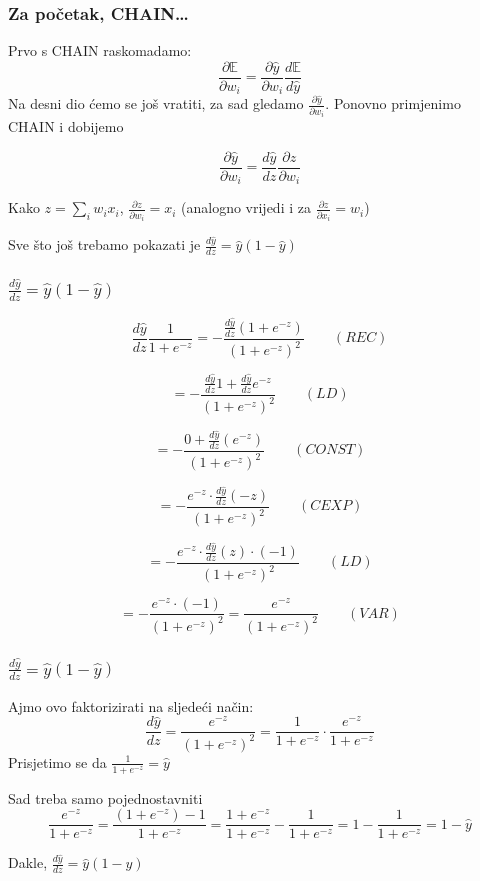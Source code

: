 \documentclass{beamer}
\begin{document}
\begin{frame}
\frametitle{Za po\v cetak, CHAIN\ldots}
Prvo s CHAIN raskomadamo:
$$\frac{\partial \mathbb{E}}{\partial w_i}= \frac{\partial \hat{y}}{\partial w_i} \frac{d \mathbb{E}}{d\hat{y}}$$\pause
Na desni dio \' cemo se jo\v s vratiti, za sad gledamo $\frac{\partial \hat{y}}{\partial w_i}$. Ponovno primjenimo CHAIN i dobijemo

$$\frac{\partial \hat{y}}{\partial w_i} = \frac{d \hat{y}}{d z} \frac{\partial z}{\partial w_i}$$\pause

Kako $z=\sum_i w_i x_i$, $\frac{\partial z}{\partial w_i}=x_i$ (analogno vrijedi i za $\frac{\partial z}{\partial x_i} = w_i$)\pause

\alert{Sve \v sto jo\v s trebamo pokazati je $\frac{d\hat{y}}{dz}=\hat{y}(1-\hat{y})$}

\end{frame}


\begin{frame}
\frametitle{$\frac{d\hat{y}}{dz}=\hat{y}(1-\hat{y})$}
$$\frac{d\hat{y}}{dz} \frac{1}{1+e^{-z}} = -  \frac{\frac{d\hat{y}}{dz} (1+e^{-z})}{(1+e^{-z})^2} \qquad (REC)$$

$$ = -\frac{\frac{d\hat{y}}{dz} 1+ \frac{d\hat{y}}{dz} e^{-z}}{(1+e^{-z})^2}  \qquad (LD)$$

$$ = -\frac{0+ \frac{d\hat{y}}{dz}(e^{-z})}{(1+e^{-z})^2}  \qquad (CONST)$$

$$ = -\frac{e^{-z} \cdot \frac{d\hat{y}}{dz}(-z)}{(1+e^{-z})^2}  \qquad (CEXP)$$

$$ = -\frac{e^{-z} \cdot \frac{d\hat{y}}{dz}(z) \cdot (-1)}{(1+e^{-z})^2}  \qquad (LD)$$

$$ = -\frac{e^{-z}  \cdot (-1)}{(1+e^{-z})^2}= \frac{e^{-z}}{(1+e^{-z})^2} \qquad (VAR)$$

\end{frame}


\begin{frame}
\frametitle{$\frac{d\hat{y}}{dz}=\hat{y}(1-\hat{y})$}

Ajmo ovo faktorizirati na sljede\' ci na\v cin:
$$\frac{d\hat{y}}{dz}=\frac{e^{-z}}{(1+e^{-z})^2}=\frac{1}{1+e^{-z}}\cdot\frac{e^{-z}}{1+e^{-z}}$$\pause
Prisjetimo se da $\frac{1}{1+e^{-z}}=\hat{y}$ \pause

Sad treba samo pojednostavniti $$\frac{e^{-z}}{1+e^{-z}}= \frac{(1+e^{-z})-1}{1+e^{-z}}=\frac{1+e^{-z}}{1+e^{-z}}-\frac{1}{1+e^{-z}}=1-\frac{1}{1+e^{-z}}=1-\hat{y}$$ \pause

\alert{Dakle, $\frac{d\hat{y}}{dz}=\hat{y}(1-\hat{y})$}

\end{frame}
\end{document}

